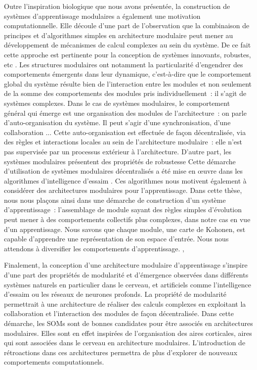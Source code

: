Outre l'inspiration biologique que nous avons présentée, la construction de systèmes d'apprentissage modulaires a également une motivation computationnelle.
Elle découle d'une part de l'observation que la combinaison de principes et d'algorithmes simples en architecture modulaire peut mener au développement de mécanismes de calcul complexes au sein du système. De ce fait cette approche est pertinente pour la conception de systèmes innovants, robustes, etc \cite{chen_modularity_2016}.
Les structures modulaires ont notamment la particularité d'engendrer des comportements émergents dans leur dynamique, c'est-à-dire que le comportement global du système résulte bien de l'interaction entre les modules et non seulement de la somme des comportements des modules pris individuellement~: il s'agit de systèmes complexes.
Dans le cas de systèmes modulaires, le comportement général qui émerge est une organisation des modules de l'architecture~: on parle d'auto-organisation du système. Il peut s'agir d'une synchronisation, d'une collaboration ...
Cette auto-organisation est effectuée de façon décentralisée, via des règles et interactions locales au sein de l'architecture modulaire~: elle n'est pas supervisée par un processus extérieur à l'architecture.
D'autre part, les systèmes modulaires présentent des propriétés de robustesse
\cite{Tang2021ARO}
Cette démarche d'utilisation de systèmes modulaires décentralisés a été mise en \oe{}uvre dans les algorithmes d'intelligence d'essaim \cite{Bonabeau1999SwarmI}. Ces algorithmes nous motivent également à considérer des architectures modulaires pour l'apprentissage.
Dans cette thèse, nous nous plaçons ainsi dans une démarche de construction d'un système d'apprentissage~: l'assemblage de module sayant des règles simples d'évolution peut mener à des comportements collectifs plus complexes, dans notre cas en vue d'un apprentissage. Nous savons que chaque module, une carte de Kohonen, est capable d'apprendre une représentation de son espace d'entrée. Nous nous attendons à diversifier les comportements d'apprentissage.
\cite{chen_modularity_2016}, 

Finalement, la conception d'une architecture modulaire d'apprentissage s'inspire d'une part des propriétés de modularité et d'émergence observées dans différents systèmes naturels en particulier dans le cerveau, et artificiels comme l'intelligence d'essaim ou les réseaux de neurones profonds.
La propriété de modularité permettrait à une architecture de réaliser des calculs complexes en exploitant la collaboration et l'interaction des modules de façon décentralisée.
Dans cette démarche, les SOMs sont de bonnes candidates pour être associés en architectures modulaires. Elles sont en effet inspirées de l'organisation des aires corticales, aires qui sont associées dans le cerveau en architecture modulaires. L'introduction de rétroactions dans ces architectures permettra de plus d'explorer de nouveaux comportements computationnels.

